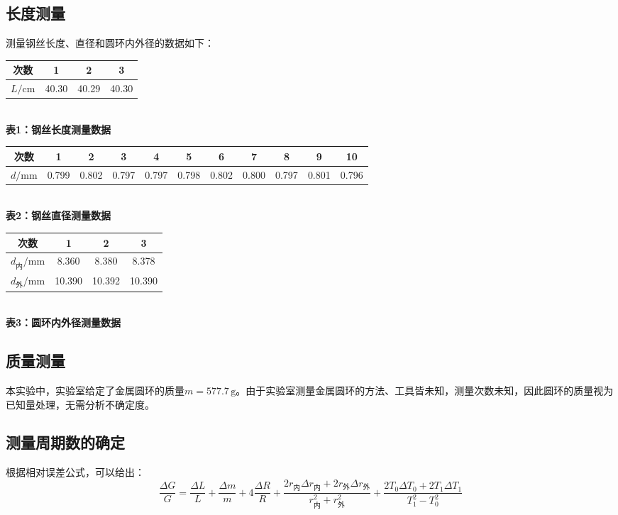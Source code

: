 \documentclass[12pt,a4paper]{article}
\begin{document}
    \subsection{长度测量}
        测量钢丝长度、直径和圆环内外径的数据如下：
        \begin{center}
            \begin{tabular}{cccc}
                \toprule
                次数 & 1 & 2 & 3 \\
                \midrule
                $L/\mathrm{cm}$ & 40.30 & 40.29 & 40.30 \\
                \bottomrule
            \end{tabular} \\
            \textbf{表1：钢丝长度测量数据} \\
            [1em]
            \begin{tabular}{ccccccccccc}
                \toprule
                次数 & 1 & 2 & 3 & 4 & 5 & 6 & 7 & 8 & 9 & 10 \\
                \midrule
                $d/\mathrm{mm}$ & 0.799 & 0.802 & 0.797 & 0.797 & 0.798 & 0.802 & 0.800 & 0.797 & 0.801 & 0.796 \\
                \bottomrule
            \end{tabular} \\
            \textbf{表2：钢丝直径测量数据} \\
            [1em]
            \begin{tabular}{cccc}
                \toprule
                次数 & 1 & 2 & 3 \\
                \midrule
                $d_\text{内}/\mathrm{mm}$ & 8.360 & 8.380 & 8.378 \\
                $d_\text{外}/\mathrm{mm}$ & 10.390 & 10.392 & 10.390 \\
                \bottomrule
            \end{tabular} \\
            \textbf{表3：圆环内外径测量数据}
        \end{center}
    \subsection{质量测量}
        本实验中，实验室给定了金属圆环的质量$m = 577.7\,\mathrm{g}$。由于实验室测量金属圆环的方法、工具皆未知，测量次数未知，因此圆环的质量视为已知量处理，无需分析不确定度。
    \subsection{测量周期数的确定}
        根据相对误差公式，可以给出：
        \[
            \frac{\Delta G}{G} = \frac{\Delta L}{L} + \frac{\Delta m}{m} + 4\frac{\Delta R}{R} + \frac{2r_\text{内}\Delta r_\text{内}+2r_\text{外}\Delta r_\text{外}}{r_\text{内}^2+r_\text{外}^2}+\frac{2T_0\Delta T_0 + 2T_1\Delta T_1}{T_1^2 - T_0^2}
        \]
        
\end{document}
